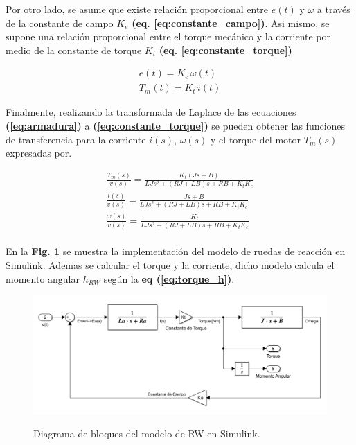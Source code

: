 Por otro lado, se asume que existe relación proporcional entre $e(t)$ y $\omega$ a través de la constante de campo $K_e$ \textbf{(eq. \ref{eq:constante_campo})}. Asi mismo, se supone una relación proporcional entre el torque mecánico y la corriente por medio de la constante de torque $K_t$ \textbf{(eq. \ref{eq:constante_torque})}

\begin{gather}
	e(t) = K_e\,\omega(t)\label{eq:constante_campo}\\[10pt]
	T_m(t) = K_t\,i(t)\label{eq:constante_torque}
\end{gather}

Finalmente, realizando la transformada de Laplace de las ecuaciones \textbf{(\ref{eq:armadura})} a \textbf{(\ref{eq:constante_torque})} se pueden obtener las funciones de transferencia para la corriente $i(s)$, $\omega(s)$ y el torque del motor $T_m(s)$ expresadas por. 

\begin{gather}
	\frac{T_m(s)}{v(s)}= \frac{K_t\left(Js+B\right)}{LJs^2 + \left(RJ+LB\right)s +RB+K_tK_e}\label{eq:trans_torque_voltaje}\\[10pt]	
	\frac{i(s)}{v(s)}= \frac{Js+B}{LJs^2 + \left(RJ+LB\right)s +RB+K_tK_e}\label{eq:trans_i_voltaje}\\[10pt]
	\frac{\omega(s)}{v(s)}= \frac{K_t}{LJs^2 + \left(RJ+LB\right)s +RB+K_tK_e}\label{eq:trans_omega_voltaje}
\end{gather}
\\

En la \textbf{Fig. \ref{fig:bloquesRW}} se muestra la implementación del modelo de ruedas de reacción en Simulink. Ademas se calcular el torque y la corriente, dicho modelo calcula el momento angular $h_{RW}$ según la \textbf{eq (\ref{eq:torque_h})}.

\begin{figure}[h]
	\begin{center}
		\includegraphics[scale=0.5]{imagenes/modelo_dinamico/bloquesRW.PNG}\\
	\end{center}
	\caption{Diagrama de bloques del modelo de RW en Simulink.}
	\label{fig:bloquesRW}
	\textit{}
\end{figure}

